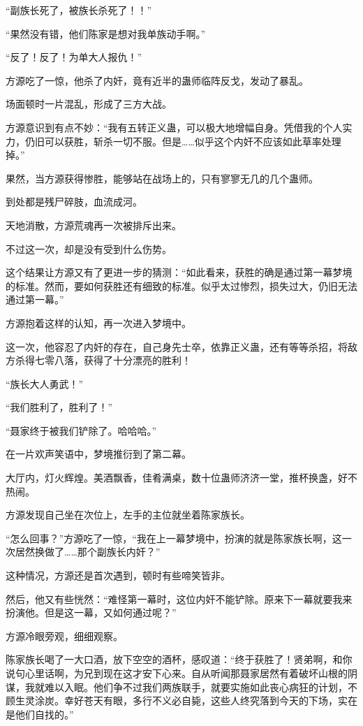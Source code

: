 \begin{this_body}
“副族长死了，被族长杀死了！！”

“果然没有错，他们陈家是想对我单族动手啊。”

“反了！反了！为单大人报仇！”

方源吃了一惊，他杀了内奸，竟有近半的蛊师临阵反戈，发动了暴乱。

场面顿时一片混乱，形成了三方大战。

方源意识到有点不妙：“我有五转正义蛊，可以极大地增幅自身。凭借我的个人实力，仍旧可以获胜，斩杀一切不服。但是……似乎这个内奸不应该如此草率处理掉。”

果然，当方源获得惨胜，能够站在战场上的，只有寥寥无几的几个蛊师。

到处都是残尸碎肢，血流成河。

天地消散，方源荒魂再一次被排斥出来。

不过这一次，却是没有受到什么伤势。

这个结果让方源又有了更进一步的猜测：“如此看来，获胜的确是通过第一幕梦境的标准。然而，要如何获胜还有细致的标准。似乎太过惨烈，损失过大，仍旧无法通过第一幕。”

方源抱着这样的认知，再一次进入梦境中。

这一次，他容忍了内奸的存在，自己身先士卒，依靠正义蛊，还有等等杀招，将敌方杀得七零八落，获得了十分漂亮的胜利！

“族长大人勇武！”

“我们胜利了，胜利了！”

“聂家终于被我们铲除了。哈哈哈。”

在一片欢声笑语中，梦境推衍到了第二幕。

大厅内，灯火辉煌。美酒飘香，佳肴满桌，数十位蛊师济济一堂，推杯换盏，好不热闹。

方源发现自己坐在次位上，左手的主位就坐着陈家族长。

“怎么回事？”方源吃了一惊，“我在上一幕梦境中，扮演的就是陈家族长啊，这一次居然换做了……那个副族长内奸？”

这种情况，方源还是首次遇到，顿时有些啼笑皆非。

然后，他又有些恍然：“难怪第一幕时，这位内奸不能铲除。原来下一幕就要我来扮演他。但是这一幕，又如何通过呢？”

方源冷眼旁观，细细观察。

陈家族长喝了一大口酒，放下空空的酒杯，感叹道：“终于获胜了！贤弟啊，和你说句心里话啊，为兄到现在这才安下心来。自从听闻那聂家居然有着破坏山根的阴谋，我就难以入眠。他们争不过我们两族联手，就要实施如此丧心病狂的计划，不顾生灵涂炭。幸好苍天有眼，多行不义必自毙，这些人终究落到今天的下场，实在是他们自找的。”


\end{this_body}
